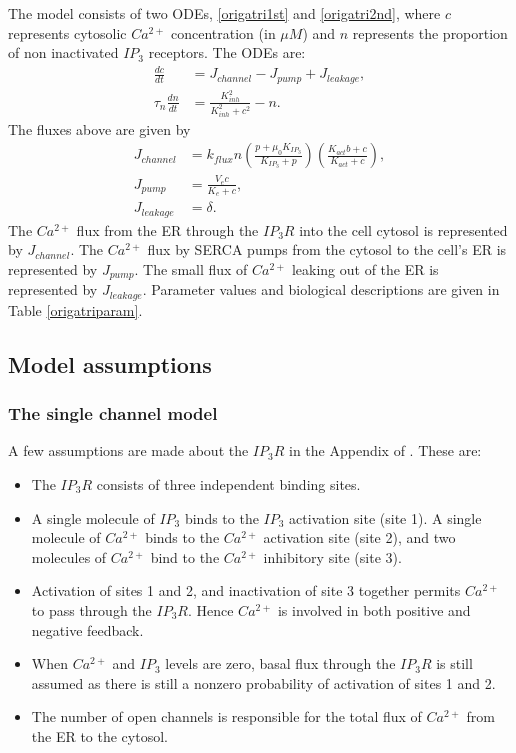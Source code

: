 The model consists of two ODEs, \eqref{origatri1st} and \eqref{origatri2nd}, where $c$ represents cytosolic $Ca^{2+}$ concentration (in $\mu M$) and $n$ represents the  proportion of non inactivated $IP_3$ 
receptors. The ODEs are:
\begin{align}
    \frac{dc}{dt}&= J_{channel}-J_{pump}+J_{leakage},\label{origatri1st}\\
    \tau_n\frac{dn}{dt}&=\frac{K_{inh}^2}{K_{inh}^2+c^2}-n.\label{origatri2nd}
\end{align}
The fluxes above are given by
\begin{align}\nonumber
    J_{channel}&=k_{flux}n\left(\frac{p+\mu_0K_{IP_3}}{K_{IP_3}+p}\right)\left(\frac{K_{act}b+c}{K_{act}+c}\right),\nonumber\\
    J_{pump}&=\frac{V_e c}{K_e+c},\nonumber\\
    J_{leakage}&=\delta.\nonumber
\end{align}
The $Ca^{2+}$ flux from the ER through the $IP_3R$ into the cell cytosol is represented by $J_{channel}$. The $Ca^{2+}$ flux by SERCA pumps from the cytosol to the cell's ER is represented by $J_{pump}$. {The small flux of $Ca^{2+}$ leaking out of the ER is represented by $J_{leakage}$}. Parameter values and biological descriptions are given in Table \ref{origatriparam}.

\subsection{Model assumptions}

\subsubsection*{The single channel model}
A few assumptions are made about the $IP_3R$ in the Appendix of . These are:
\begin{itemize}
    \item The $IP_3R$ consists of three independent binding sites.
    \item A single molecule of $IP_3$ binds to the $IP_3$ activation site (site 1). A single molecule of $Ca^{2+}$ binds to the $Ca^{2+}$ activation site (site 2), and two molecules of $Ca^{2+}$ bind to the ${Ca^{2+}}$ inhibitory site (site 3).
    \item Activation of sites 1 and 2, and inactivation of site 3 together permits $Ca^{2+}$ to pass through the $IP_3R$. Hence $Ca^{2+}$ is involved in both positive and negative feedback.
    \item When $Ca^{2+}$ and ${IP_3}$ levels are zero, basal flux through the $IP_3R$ is still assumed as there is still a nonzero probability of activation of sites 1 and 2.
    \item The number of open channels is responsible for the total flux of $Ca^{2+}$ from the ER to the cytosol. 
\end{itemize}

